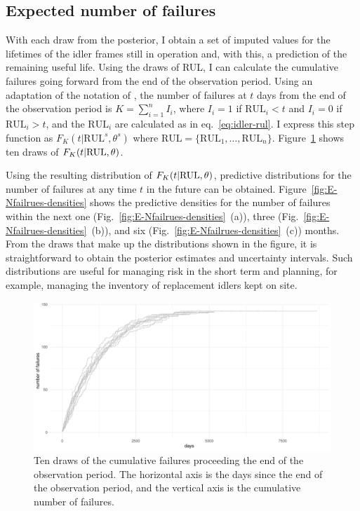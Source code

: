 \subsection{Expected number of failures} \label{subsec:idler-cumulative-failrues}

With each draw from the posterior, I obtain a set of imputed values for the lifetimes of the idler frames still in operation and, with this, a prediction of the remaining useful life. Using the draws of RUL, I can calculate the cumulative failures going forward from the end of the observation period. Using an adaptation of the notation of \citet[sec.~6]{hong2009}, the number of failures at $t$ days from the end of the observation period is $K = \sum^{n}_{i = 1}I_i$, where $I_i = 1$ if $\text{RUL}_i < t$ and $I_i = 0$ if $\text{RUL}_i > t$, and the $\text{RUL}_i$ are calculated as in eq.~\eqref{eq:idler-rul}. I express this step function as $F_K(t|\text{RUL}^s, \theta^s)$ where $\text{RUL} = \{\text{RUL}_1, \dots, \text{RUL}_n\}$. Figure~\ref{fig:E-Nfailrues-draws} shows ten draws of $F_K(t|\hbox{RUL}, \theta)$.

Using the resulting distribution of $F_K(t|\hbox{RUL}, \theta)$, predictive distributions for the number of failures at any time $t$ in the future can be obtained. Figure~\ref{fig:E-Nfailrues-densities} shows the predictive densities for the number of failures within the next one (Fig.~\ref{fig:E-Nfailrues-densities}~(a)), three (Fig.~\ref{fig:E-Nfailrues-densities}~(b)), and six (Fig.~\ref{fig:E-Nfailrues-densities}~(c)) months. From the draws that make up the distributions shown in the figure, it is straightforward to obtain the posterior estimates and uncertainty intervals. Such distributions are useful for managing risk in the short term and planning, for example, managing the inventory of replacement idlers kept on site.

\begin{figure}
  \centering
  \includegraphics[width=1\textwidth]{./figures/ch-3/E-n-failures-draws.pdf}
  \caption{Ten draws of the cumulative failures proceeding the end of the observation period. The horizontal axis is the days since the end of the observation period, and the vertical axis is the cumulative number of failures.}
  \label{fig:E-Nfailrues-draws}
\end{figure}

